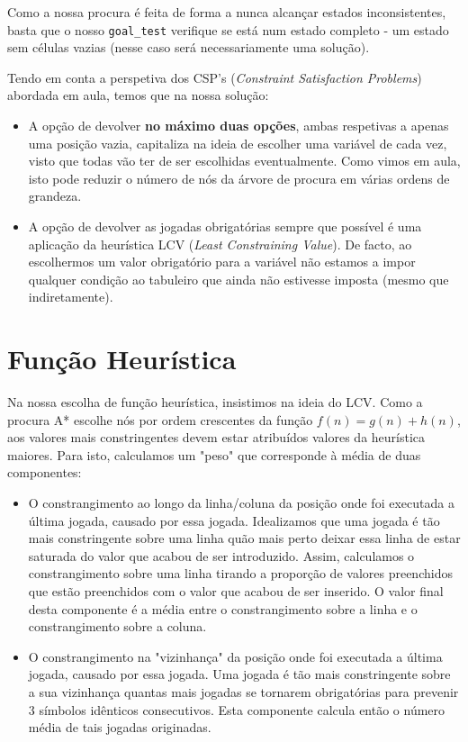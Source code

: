 \documentclass[12pt,a4paper]{article}
\begin{document}
Como a nossa procura é feita de forma a nunca alcançar estados inconsistentes, basta que o nosso \texttt{goal\_test} verifique se está num estado completo - um estado sem células vazias (nesse caso será necessariamente uma solução).

Tendo em conta a perspetiva dos CSP's (\textit{Constraint Satisfaction Problems}) abordada em aula, temos que na nossa solução:
\begin{itemize}
      \item A opção de devolver \textbf{no máximo duas opções}, ambas respetivas a apenas uma posição vazia, capitaliza na ideia de escolher uma variável de cada vez, visto que todas vão ter de ser escolhidas eventualmente.
        Como vimos em aula, isto pode reduzir o número de nós da árvore de procura em várias ordens de grandeza.
      \item A opção de devolver as jogadas obrigatórias sempre que possível é uma aplicação da heurística LCV (\textit{Least Constraining Value}).
        De facto, ao escolhermos um valor obrigatório para a variável não estamos a impor qualquer condição ao tabuleiro que ainda não estivesse imposta (mesmo que indiretamente).
\end{itemize}

\section*{Função Heurística}

Na nossa escolha de função heurística, insistimos na ideia do LCV. Como a procura A* escolhe nós por ordem crescentes da função $f(n) = g(n) + h(n)$, aos valores mais constringentes devem estar atribuídos valores da heurística maiores. Para isto, calculamos um "peso" que corresponde à média de duas componentes:
\begin{itemize}
      \item O constrangimento ao longo da linha/coluna da posição onde foi executada a última jogada, causado por essa jogada.
        Idealizamos que uma jogada é tão mais constringente sobre uma linha quão mais perto deixar essa linha de estar saturada do valor que acabou de ser introduzido. 
        Assim, calculamos o constrangimento sobre uma linha tirando a proporção de valores preenchidos que estão preenchidos com o valor que acabou de ser inserido.
        O valor final desta componente é a média entre o constrangimento sobre a linha e o constrangimento sobre a coluna.
      \item O constrangimento na "vizinhança" da posição onde foi executada a última jogada, causado por essa jogada.
        Uma jogada é tão mais constringente sobre a sua vizinhança quantas mais jogadas se tornarem obrigatórias para prevenir 3 símbolos idênticos consecutivos.
        Esta componente calcula então o número média de tais jogadas originadas.
\end{itemize}
\end{document}
